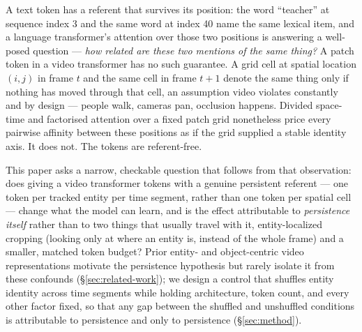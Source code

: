 
A text token has a referent that survives its position: the word ``teacher''
at sequence index 3 and the same word at index 40 name the same lexical
item, and a language transformer's attention over those two positions is
answering a well-posed question --- \emph{how related are these two
mentions of the same thing?} A patch token in a video transformer has no
such guarantee. A grid cell at spatial location $(i,j)$ in frame $t$ and the
same cell in frame $t{+}1$ denote the same thing only if nothing has moved
through that cell, an assumption video violates constantly and by design ---
people walk, cameras pan, occlusion happens. Divided space-time and
factorised attention over a fixed patch grid nonetheless price every pairwise
affinity between these positions as if the grid supplied a stable identity
axis. It does not. The tokens are referent-free.

This paper asks a narrow, checkable question that follows from that
observation: does giving a video transformer tokens with a genuine
persistent referent --- one token per tracked entity per time segment,
rather than one token per spatial cell --- change what the model can learn,
and is the effect attributable to \emph{persistence itself} rather than to
two things that usually travel with it, entity-localized cropping (looking
only at where an entity is, instead of the whole frame) and a smaller,
matched token budget? Prior entity- and object-centric video representations
motivate the persistence hypothesis but rarely isolate it from these
confounds (\S\ref{sec:related-work}); we design a control that shuffles
entity identity across time segments while holding architecture, token
count, and every other factor fixed, so that any gap between the shuffled
and unshuffled conditions is attributable to persistence and only to
persistence (\S\ref{sec:method}).


